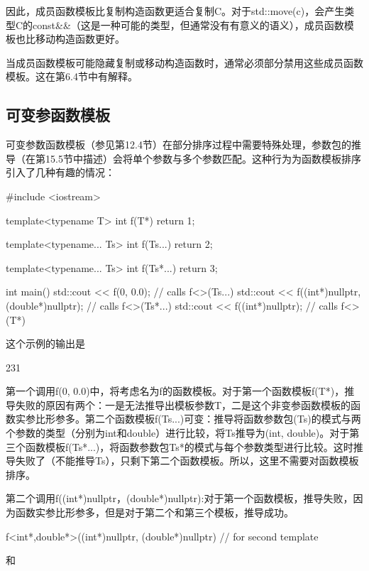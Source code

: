 因此，成员函数模板比复制构造函数更适合复制C。对于std::move(c)，会产生类型C的const\&\&（这是一种可能的类型，但通常没有有意义的语义），成员函数模板也比移动构造函数更好。

当成员函数模板可能隐藏复制或移动构造函数时，通常必须部分禁用这些成员函数模板。这在第6.4节中有解释。

\subsection{可变参函数模板}

可变参数函数模板（参见第12.4节）在部分排序过程中需要特殊处理，参数包的推导（在第15.5节中描述）会将单个参数与多个参数匹配。这种行为为函数模板排序引入了几种有趣的情况：

\begin{cpp}
#include <iostream>

template<typename T>
int f(T*)
{
	return 1;
}

template<typename... Ts>
int f(Ts...)
{
	return 2;
}

template<typename... Ts>
int f(Ts*...)
{
	return 3;
}

int main()
{
	std::cout << f(0, 0.0); // calls f<>(Ts...)
	std::cout << f((int*)nullptr, (double*)nullptr); // calls f<>(Ts*...)
	std::cout << f((int*)nullptr); // calls f<>(T*)
}
\end{cpp}

这个示例的输出是

\begin{shell}
231
\end{shell}

第一个调用f(0, 0.0)中，将考虑名为f的函数模板。对于第一个函数模板f(T*)，推导失败的原因有两个：一是无法推导出模板参数T，二是这个非变参函数模板的函数实参比形参多。第二个函数模板f(Ts...)可变：推导将函数参数包(Ts)的模式与两个参数的类型（分别为int和double）进行比较，将Ts推导为(int, double)。对于第三个函数模板f(Ts*...)，将函数参数包Ts*的模式与每个参数类型进行比较。这时推导失败了（不能推导Ts），只剩下第二个函数模板。所以，这里不需要对函数模板排序。

第二个调用f((int*)nullptr，(double*)nullptr):对于第一个函数模板，推导失败，因为函数实参比形参多，但是对于第二个和第三个模板，推导成功。

\begin{cpp}
f<int*,double*>((int*)nullptr, (double*)nullptr) // for second template
\end{cpp}

和

